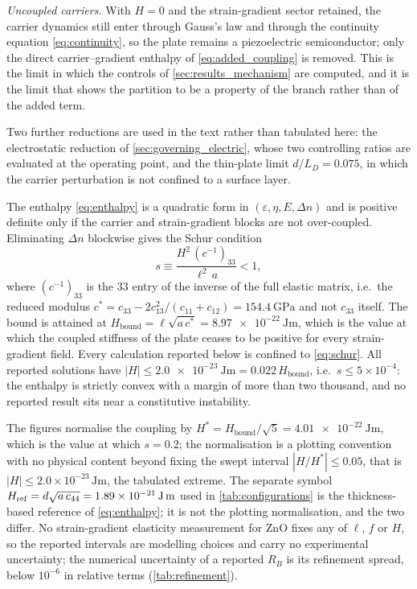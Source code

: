 \emph{Uncoupled carriers.}  With $H=0$ and the strain-gradient sector retained,
the carrier dynamics still enter through Gauss's law and through the continuity
equation \eqref{eq:continuity}, so the plate remains a piezoelectric
semiconductor; only the direct carrier--gradient enthalpy of
\eqref{eq:added_coupling} is removed.  This is the limit in which the controls
of \cref{sec:results_mechanism} are computed, and it is the limit that shows the
partition to be a property of the branch rather than of the added term.

Two further reductions are used in the text rather than tabulated here: the
electrostatic reduction of \cref{sec:governing_electric}, whose two controlling
ratios are evaluated at the operating point, and the thin-plate limit
$d/L_D=0.075$, in which the carrier perturbation is not confined to a surface
layer.


The enthalpy \eqref{eq:enthalpy} is a quadratic form in
$(\varepsilon,\eta,E,\Delta n)$ and is positive definite only if the carrier and
strain-gradient blocks are not over-coupled.  Eliminating $\Delta n$ blockwise
gives the Schur condition
\begin{equation}
\label{eq:schur}
s\equiv\frac{H^2\,(c^{-1})_{33}}{\ell^2\,a}<1 ,
\end{equation}
where $(c^{-1})_{33}$ is the $33$ entry of the inverse of the full elastic
matrix, i.e.\ the reduced modulus
$c^{*}=c_{33}-2c_{13}^2/(c_{11}+c_{12})=\SI{154.4}{\giga\pascal}$ and not $c_{33}$
itself.  The bound is attained at
$H_{\text{bound}}=\ell\sqrt{a\,c^{*}}=\SI{8.97e-22}{\joule\metre}$, which is the
value at which the coupled stiffness of the plate ceases to be positive for
every strain-gradient field.  Every calculation reported below is confined to \eqref{eq:schur}.  All reported solutions have
$|H|\le\SI{2.0e-23}{\joule\metre}=0.022\,H_{\text{bound}}$, i.e.\ $s\le
5\times10^{-4}$: the enthalpy is strictly convex with a margin of more than two
thousand, and no reported result sits near a constitutive instability.

The figures normalise the coupling by
$H^{*}=H_{\text{bound}}/\sqrt5=\SI{4.01e-22}{\joule\metre}$, which is the value
at which $s=0.2$; the normalisation is a plotting convention with no physical
content beyond fixing the swept interval $|H/H^{*}|\le0.05$, that is
$|H|\le2.0\times10^{-23}\,\si{\joule\metre}$, the tabulated extreme.  The
separate symbol $H_{\mathrm{ref}}=d\sqrt{a\,c_{44}}=\SI{1.89e-21}{%
\joule\metre}$ used in \cref{tab:configurations} is the thickness-based
reference of \eqref{eq:enthalpy}; it is not the plotting normalisation, and the two differ.  No strain-gradient elasticity measurement for
ZnO fixes any of $\ell$, $f$ or $H$, so the reported intervals are modelling
choices and carry no experimental uncertainty; the numerical uncertainty of a
reported $R_B$ is its refinement spread, below $10^{-6}$ in relative terms
(\cref{tab:refinement}).
